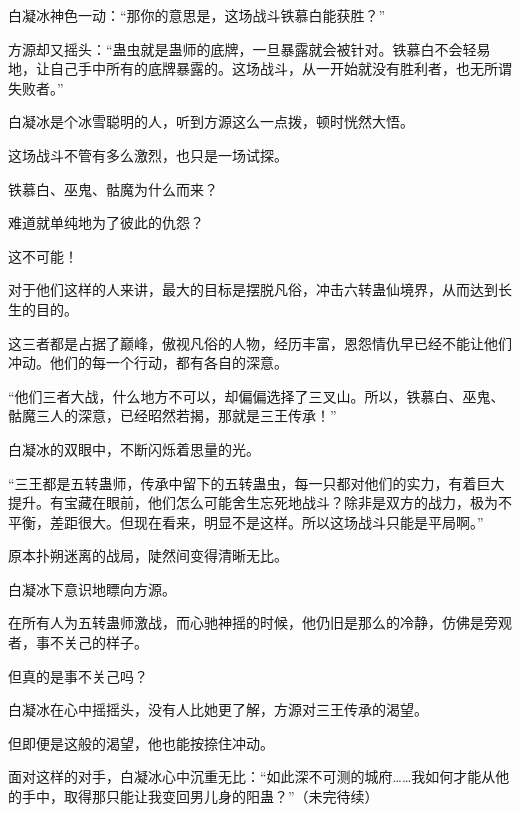 \begin{this_body}
白凝冰神色一动：“那你的意思是，这场战斗铁慕白能获胜？”

方源却又摇头：“蛊虫就是蛊师的底牌，一旦暴露就会被针对。铁慕白不会轻易地，让自己手中所有的底牌暴露的。这场战斗，从一开始就没有胜利者，也无所谓失败者。”

白凝冰是个冰雪聪明的人，听到方源这么一点拨，顿时恍然大悟。

这场战斗不管有多么激烈，也只是一场试探。

铁慕白、巫鬼、骷魔为什么而来？

难道就单纯地为了彼此的仇怨？

这不可能！

对于他们这样的人来讲，最大的目标是摆脱凡俗，冲击六转蛊仙境界，从而达到长生的目的。

这三者都是占据了巅峰，傲视凡俗的人物，经历丰富，恩怨情仇早已经不能让他们冲动。他们的每一个行动，都有各自的深意。

“他们三者大战，什么地方不可以，却偏偏选择了三叉山。所以，铁慕白、巫鬼、骷魔三人的深意，已经昭然若揭，那就是三王传承！”

白凝冰的双眼中，不断闪烁着思量的光。

“三王都是五转蛊师，传承中留下的五转蛊虫，每一只都对他们的实力，有着巨大提升。有宝藏在眼前，他们怎么可能舍生忘死地战斗？除非是双方的战力，极为不平衡，差距很大。但现在看来，明显不是这样。所以这场战斗只能是平局啊。”

原本扑朔迷离的战局，陡然间变得清晰无比。

白凝冰下意识地瞟向方源。

在所有人为五转蛊师激战，而心驰神摇的时候，他仍旧是那么的冷静，仿佛是旁观者，事不关己的样子。

但真的是事不关己吗？

白凝冰在心中摇摇头，没有人比她更了解，方源对三王传承的渴望。

但即便是这般的渴望，他也能按捺住冲动。

面对这样的对手，白凝冰心中沉重无比：“如此深不可测的城府……我如何才能从他的手中，取得那只能让我变回男儿身的阳蛊？”（未完待续）

\end{this_body}


